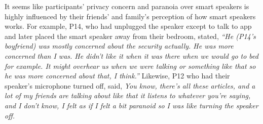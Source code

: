         It seems like participants' privacy concern and paranoia over smart speakers is highly influenced by their friends' and family's perception of how smart speakers works. 
        For example, P14, who had unplugged the speaker except to talk to \acl{app} and later placed the smart speaker away from their bedroom, stated,
                \textit{``He (P14's boyfriend) was mostly concerned about the security actually. He was more concerned than I was. 
                He didn't like it when it was there when we would go to bed for example. 
                It might overhear us when we were talking or something like that so he was more concerned about that, I think.''}
        Likewise, P12 who had their speaker's microphone turned off, said,
                \textit{You know, there's all these articles, and a lot of my friends are talking about like that it listens to whatever you're saying, and I don't know, I felt as if I felt a bit paranoid so I was like turning the speaker off. 
                }



